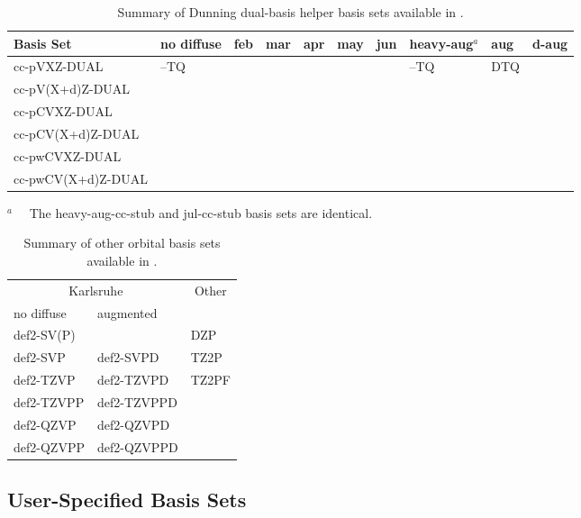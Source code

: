 \begin{table}[!htbp]
\begin{footnotesize}
\caption{Summary of Dunning dual-basis helper basis sets available in \PSIfour.} \label{table:basisDunningDUAL}
\parsep 10pt
\begin{center}
\begin{tabular}{llllllllll}
\hline\hline
Basis Set            & no diffuse & feb & mar & apr & may & jun & heavy-aug$^a$ & aug & d-aug \\
\hline
cc-pVXZ-DUAL         & --TQ &  &  &  &  &  & --TQ & DTQ &  \\
cc-pV(X+d)Z-DUAL     \\
cc-pCVXZ-DUAL        \\
cc-pCV(X+d)Z-DUAL    \\
cc-pwCVXZ-DUAL       \\
cc-pwCV(X+d)Z-DUAL   \\
\hline\hline
\end{tabular}
\end{center}
$^a\quad$ The heavy-aug-cc-stub and jul-cc-stub basis sets are identical.
\end{footnotesize}
\end{table}


\begin{table}[!htbp]
\begin{footnotesize}
\caption{Summary of other orbital basis sets available in \PSIfour.} \label{table:basisOther}
\parsep 10pt
\begin{center}
\begin{tabular}{lll}
\hline\hline
\multicolumn{2}{c}{Karlsruhe} & \multicolumn{1}{c}{Other} \\
no diffuse & augmented & \\
\hline
def2-SV(P)   &             & DZP   \\
def2-SVP     & def2-SVPD   & TZ2P  \\
def2-TZVP    & def2-TZVPD  & TZ2PF \\
def2-TZVPP   & def2-TZVPPD &       \\
def2-QZVP    & def2-QZVPD  &       \\
def2-QZVPP   & def2-QZVPPD &       \\
\hline\hline
\end{tabular}
\end{center}
\end{footnotesize}
\end{table}


\subsection{User-Specified Basis Sets}

